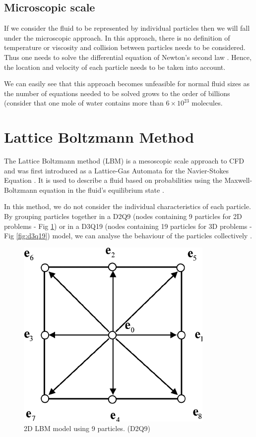 \documentclass[12pt, openany]{book}
\begin{document}
\subsection{Microscopic scale}
If we consider the fluid to be represented by individual particles then we will fall under the microscopic approach. In this approach, there is no definition of temperature or viscosity and collision between particles needs to be considered. Thus one needs to solve the differential equation of Newton’s second law \cite{lbm_springer}. Hence, the location and velocity of each particle needs to be taken into account.
	\par We can easily see that this approach becomes unfeasible for normal fluid sizes as the number of equations needed to be solved grows to the order of billions (consider that one mole of water contains more than $6 \times 10^{23}$ molecules.


\section{Lattice Boltzmann Method} \label{sec:lbmLit}
The Lattice Boltzmann method (LBM) is a mesoscopic scale approach to CFD and was first introduced as a Lattice-Gas Automata for the Navier-Stokes Equation \cite{gasautomata}. It is used to describe a fluid based on probabilities using the Maxwell-Boltzmann equation in the fluid’s equilibrium state \cite{lbm_springer}. 
\par In this method, we do not consider the individual characteristics of each particle. By grouping particles together in a D2Q9 (nodes containing 9 particles for 2D problems - Fig \ref{fig:d2q9})  or in a D3Q19 (nodes containing 19 particles for 3D problems - Fig \ref{fig:d3q19}) model, we can analyse the behaviour of the particles collectively  \cite{lbm_springer}. 

\begin{figure}[H]
\centering
  \includegraphics[width=0.3\linewidth]{Resources/Images/d2q9.png}
  \caption{2D LBM model using 9 particles. (D2Q9)}
  \label{fig:d2q9}
\end{figure}
\end{document}
